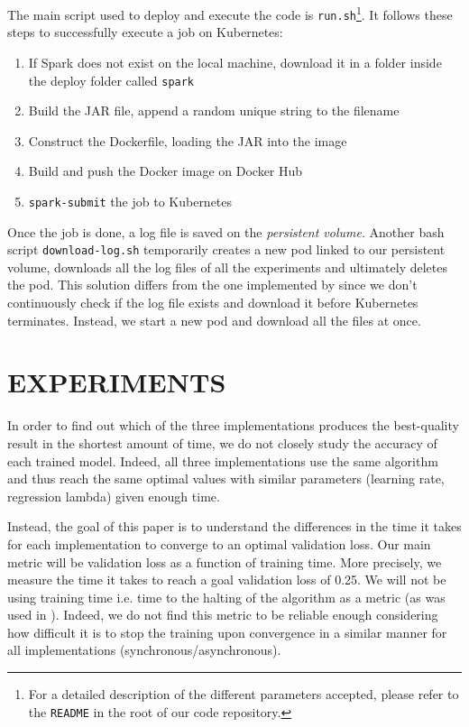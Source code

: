 \documentclass[a4paper, 11pt, conference]{ieeeconf}
\begin{document}
The main script used to deploy and execute the code is \texttt{run.sh}\footnote{For a detailed description of the different parameters accepted, please refer to the \texttt{README} in the root of our code repository.}. It follows these steps to successfully execute a job on Kubernetes:
\begin{enumerate}
	\item If Spark does not exist on the local machine, download it in a folder inside the deploy folder called \texttt{spark}
	\item Build the JAR file, append a random unique string to the filename
	\item Construct the Dockerfile, loading the JAR into the image
	\item Build and push the Docker image on Docker Hub
	\item \texttt{spark-submit} the job to Kubernetes
\end{enumerate}

Once the job is done, a log file is saved on the \textit{persistent volume}. Another bash script \texttt{download-log.sh} temporarily creates a new pod linked to our persistent volume, downloads all the log files of all the experiments and ultimately deletes the pod. This solution differs from the one implemented by \cite{hogwild-python} since we don't continuously check if the log file exists and download it before Kubernetes terminates. Instead, we start a new pod and download all the files at once.

\section{EXPERIMENTS}

In order to find out which of the three implementations produces the best-quality result in the shortest amount of time, we do not closely study the accuracy of each trained model. Indeed, all three implementations use the same algorithm and thus reach the same optimal values with similar parameters (learning rate, regression lambda) given enough time. 

Instead, the goal of this paper is to understand the differences in the time it takes for each implementation to converge to an optimal validation loss. Our main metric will be validation loss as a function of training time. More precisely, we measure the time it takes to reach a goal validation loss of 0.25. We will not be using training time i.e. time to the halting of the algorithm as a metric (as was used in \cite{hogwild-python}). Indeed, we do not find this metric to be reliable enough considering how difficult it is to stop the training upon convergence in a similar manner for all implementations (synchronous/asynchronous).
\end{document}
